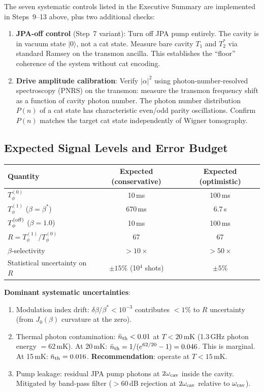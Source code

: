 \documentclass[11pt]{article}
\theoremstyle{definition}
\theoremstyle{remark}
\begin{document}
The seven systematic controls listed in the Executive Summary are
implemented in Steps~9--13 above, plus two additional checks:

\begin{enumerate}
\item \textbf{JPA-off control} (Step~7 variant): Turn off JPA pump
  entirely. The cavity is in vacuum state $|0\rangle$, not a cat state.
  Measure bare cavity $T_1$ and $T_2^*$ via standard Ramsey on the
  transmon ancilla. This establishes the ``floor'' coherence of the
  system without cat encoding.

\item \textbf{Drive amplitude calibration}: Verify $|\alpha|^2$ using
  photon-number-resolved spectroscopy (PNRS) on the transmon: measure
  the transmon frequency shift as a function of cavity photon number.
  The photon number distribution $P(n)$ of a cat state has
  characteristic even/odd parity oscillations. Confirm $P(n)$ matches
  the target cat state independently of Wigner tomography.
\end{enumerate}

\subsection{Expected Signal Levels and Error Budget}

\begin{center}
\begin{tabular}{@{}lcc@{}}
\toprule
Quantity & Expected (conservative) & Expected (optimistic) \\
\midrule
$T_\phi^{(0)}$ & 10\,ms & 100\,ms \\
$T_\phi^{(1)}$ ($\beta = \beta^*$) & 670\,ms & 6.7\,s \\
$T_\phi^{(\rm off)}$ ($\beta = 1.0$) & 10\,ms & 100\,ms \\
$R = T_\phi^{(1)}/T_\phi^{(0)}$ & 67 & 67 \\
$\beta$-selectivity & $> 10\times$ & $> 50\times$ \\
Statistical uncertainty on $R$ & $\pm 15\%$ (10$^4$ shots) & $\pm 5\%$ \\
\bottomrule
\end{tabular}
\end{center}

\textbf{Dominant systematic uncertainties}:
\begin{enumerate}[nosep]
\item Modulation index drift: $\delta\beta/\beta^* < 10^{-3}$
  contributes $< 1\%$ to $R$ uncertainty (from $J_0(\beta)$ curvature
  at the zero).
\item Thermal photon contamination: $\bar n_{\rm th} < 0.01$ at
  $T < 20$\,mK (1.3\,GHz photon energy $= 62$\,mK). At 20\,mK:
  $\bar n_{\rm th} = 1/(e^{62/20} - 1) = 0.046$. This is marginal.
  At 15\,mK: $\bar n_{\rm th} = 0.016$. \textbf{Recommendation}:
  operate at $T < 15$\,mK.
\item Pump leakage: residual JPA pump photons at $2\omega_{\rm cav}$
  inside the cavity. Mitigated by band-pass filter ($> 60$\,dB rejection
  at $2\omega_{\rm cav}$ relative to $\omega_{\rm cav}$).
\end{enumerate}
\end{document}
